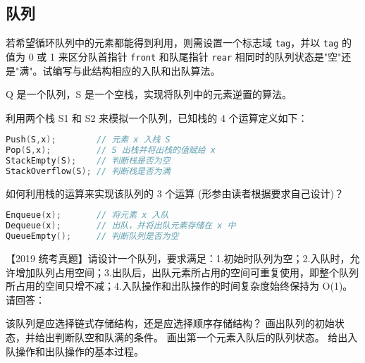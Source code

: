 \subsection{队列}

\begin{qitems}

    \begin{bbox}
        \qitem 若希望循环队列中的元素都能得到利用，则需设置一个标志域 \texttt{tag}，并以 \texttt{tag} 的值为 0 或 1 来区分队首指针 \texttt{front} 和队尾指针 \texttt{rear} 相同时的队列状态是"空"还是"满"。试编写与此结构相应的入队和出队算法。
    \end{bbox}

    \begin{bbox}
        \qitem Q 是一个队列，S 是一个空栈，实现将队列中的元素逆置的算法。
    \end{bbox}

    \begin{bbox}
        \qitem 利用两个栈 S1 和 S2 来模拟一个队列，已知栈的 4 个运算定义如下：
        \begin{lstlisting}[language=C, basicstyle=\ttfamily\small]
Push(S,x);        // 元素 x 入栈 S
Pop(S,x);         // S 出栈并将出栈的值赋给 x
StackEmpty(S);    // 判断栈是否为空
StackOverflow(S); // 判断栈是否为满
        \end{lstlisting}
        如何利用栈的运算来实现该队列的 3 个运算 (形参由读者根据要求自己设计)？
        \begin{lstlisting}[language=C, basicstyle=\ttfamily\small]
Enqueue(x);       // 将元素 x 入队
Dequeue(x);       // 出队，并将出队元素存储在 x 中
QueueEmpty();     // 判断队列是否为空
        \end{lstlisting}
    \end{bbox}

    \begin{bbox}
        \qitem 【2019 统考真题】请设计一个队列，要求满足：1.初始时队列为空；2.入队时，允许增加队列占用空间；3.出队后，出队元素所占用的空间可重复使用，即整个队列所占用的空间只增不减；4.入队操作和出队操作的时间复杂度始终保持为 O(1)。请回答：
        \begin{subqitems}
            \subqitem 该队列是应选择链式存储结构，还是应选择顺序存储结构？
            \subqitem 画出队列的初始状态，并给出判断队空和队满的条件。
            \subqitem 画出第一个元素入队后的队列状态。
            \subqitem 给出入队操作和出队操作的基本过程。
        \end{subqitems}
    \end{bbox}

\end{qitems} 